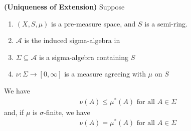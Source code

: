 \documentclass{report}
\begin{document}
\begin{theorem}
\textbf{(Uniqueness of Extension)} Suppose 
\begin{enumerate}[label=(\alph*)]
  \item $(X,S,\mu)$ is a pre-measure space, and $S$ is a semi-ring.
  \item $\mathcal{A}$ is the induced sigma-algebra in   
  \item $\Sigma\subseteq \mathcal{A}$ is a sigma-algebra containing $S$  
  \item $\nu :\Sigma \rightarrow [0,\infty]$ is a measure agreeing with $\mu$ on $S$
\end{enumerate}
We have 
\begin{align}
\label{vmu1}
\nu (A)\leq \mu^*(A)\text{ for all $A\in \Sigma$ }
\end{align}
and, if $\mu$ is $\sigma$-finite, we have
\begin{align}
\label{vmu2}
\nu (A)=\mu^*(A)\text{ for all $A \in \Sigma$  }
\end{align}
\end{theorem}
\end{document}
